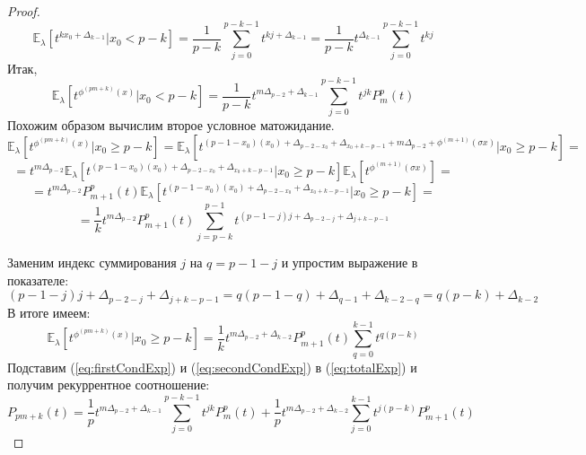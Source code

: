 \documentclass[14pt, a4paper, russian]{report}
\begin{document}
\begin{proof}
$$ \mathbb{E}_\lambda\left[ t^{ k x_0 + \Delta_{k-1}} | x_0 < p-k \right] =
 \frac{1}{p-k}\sum\limits_{j=0}^{p-k-1} t^{ k j + \Delta_{k-1}} = 
 \frac{1}{p-k} t^{\Delta_{k-1}}\sum\limits_{j=0}^{p-k-1} t^{kj}$$
 Итак, \begin{equation}\label{eq:firstCondExp}\mathbb{E}_\lambda\left[ t^{\phi^{(pm+k)}(x)}| x_0 < p-k \right] =
  \frac{1}{p-k} t^{m\Delta_{p-2} + \Delta_{k-1}}\sum\limits_{j=0}^{p-k-1} t^{jk} P_m^p(t)
   \end{equation}
Похожим образом вычислим второе условное матожидание. 
 $$\mathbb{E}_\lambda\left[ t^{\phi^{(pm+k)}(x)}| x_0 \ge p-k \right] = 
 \mathbb{E}_\lambda\left[ t^{(p-1-x_0)(x_0) + \Delta_{p-2-x_0} + \Delta_{x_0+k-p-1}+m\Delta_{p-2}+\phi^{(m+1)}(\sigma x)}| x_0 \ge p-k \right] = $$
 $$ =t^{m\Delta_{p-2}}
 \mathbb{E}_\lambda\left[ t^{(p-1-x_0)(x_0) + \Delta_{p-2-x_0} + \Delta_{x_0+k-p-1}} | x_0 \ge p-k \right] 
 \mathbb{E}_\lambda\left[ t^{\phi^{(m+1)}(\sigma x) } \right] = $$
  $$ =t^{m\Delta_{p-2}}
    P_{m+1}^p(t)
 \mathbb{E}_\lambda\left[ t^{(p-1-x_0)(x_0) + \Delta_{p-2-x_0} + \Delta_{x_0+k-p-1}} | x_0 \ge p-k \right] = $$
  $$ = \frac{1}{k} t^{m\Delta_{p-2}} P_{m+1}^p(t)
  \sum\limits_{j=p-k}^{p-1} t^{  (p-1-j) j + \Delta_{p-2-j} + \Delta_{j+k-p-1}}$$

Заменим индекс суммирования $j$ на $q = p-1-j$ и упростим выражение в показателе:
$$  (p-1-j) j + \Delta_{p-2-j} + \Delta_{j+k-p-1} =
    q(p-1-q) + \Delta_{q-1} + \Delta_{k-2-q}=
   q(p-k)+\Delta_{k-2} 
$$   
В итоге имеем: 
\begin{equation}\label{eq:secondCondExp}
\mathbb{E}_\lambda\left[ t^{\phi^{(pm+k)}(x)}| x_0 \ge p-k \right] 
 =  \frac{1}{k} t^{m\Delta_{p-2} + \Delta_{k-2}} P_{m+1}^p(t)
  \sum\limits_{q=0}^{k-1} t^{q(p-k)}
  \end{equation}
Подставим (\ref{eq:firstCondExp}) и (\ref{eq:secondCondExp}) в (\ref{eq:totalExp}) и получим рекуррентное соотношение:
$$P_{pm+k}(t)  =   \frac{1}{p} t^{m\Delta_{p-2} + \Delta_{k-1}}\sum\limits_{j=0}^{p-k-1} t^{jk} P_m^p(t) 
      + \frac{1}{p} t^{m\Delta_{p-2} + \Delta_{k-2}}\sum\limits_{j=0}^{k-1} t^{j(p-k)} P_{m+1}^p(t) $$
\end{proof}
\end{document}
